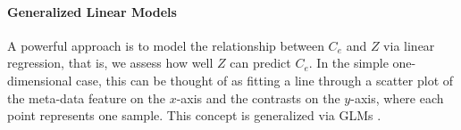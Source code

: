 

\paragraph{Generalized Linear Models}
\label{sec:Factorization:sub:Methods:sub:ObjectiveFunction:par:GLMs}

A powerful approach is to model the relationship between $C_e$ and $Z$ via linear regression,
that is, we assess how well $Z$ can predict $C_e$.
In the simple one-dimensional case, this can be thought of as fitting a line through a scatter plot
of the meta-data feature on the $x$-axis and the contrasts on the $y$-axis, where each point represents one sample.
This concept is generalized via \acfp{GLM} \cite{Nelder1972,McCullagh1989,Agresti2018}.

